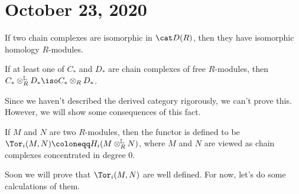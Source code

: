 \documentclass{standalone}
\begin{document}
\chapter{October 23, 2020}

If two chain complexes are isomorphic in \(\der(R)\),
then they have isomorphic homology \(R\)-modules.

\begin{fact}
  If at least one of \(C_*\) and \(D_*\) are
  chain complexes of free \(R\)-modules,
  then \(C_* \otimes_R^{\mathbb L} D_* \iso C_* \otimes_R D_*\).
\end{fact}
Since we haven't described the derived category rigorously,
we can't prove this. However, we will show some consequences of this fact.

\begin{definition}
  If \(M\) and \(N\) are two \(R\)-modules,
  then the \vocab{\(\Tor\)} functor is defined to be
  \(\Tor_i(M, N) \coloneqq H_i(M \otimes^{\mathbb L}_R N)\),
  where \(M\) and \(N\) are viewed as
  chain complexes concentrated in degree \(0\).
\end{definition}
Soon we will prove that \(\Tor_i(M, N)\) are well defined.
For now, let's do some calculations of them.
\end{document}
